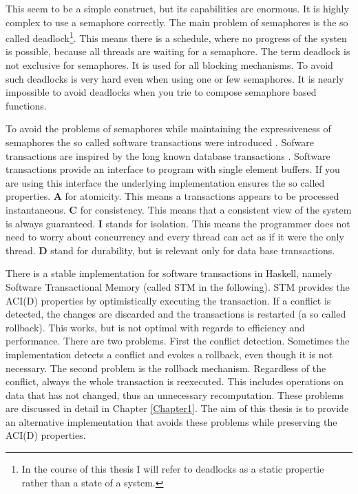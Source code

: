 This seem to be a simple construct, but its capabilities are enormous. It is highly complex to use a semaphore correctly.
The main problem of semaphores is the so called deadlock\footnote{In the course of this thesis I will refer to deadlocks as a static propertie rather than a state of a system.}. 
This means there is a schedule, where no progress of the systen is possible, because all threads are waiting for a semaphore. The term deadlock is not exclusive for semaphores.
It is used for all blocking mechanisms. To avoid such deadlocks is very hard even when using one or few semaphores. 
It is nearly impossible to avoid deadlocks when you trie to compose semaphore based functions.

To avoid the problems of semaphores while maintaining the expressiveness of semaphores the so called software transactions were introduced \parencite{STMBase}.
Sofware transactions are inspired by the long known database transactions \parencite{DBTrans}. Software transactions provide an interface to program with 
single element buffers. If you are using this interface the underlying implementation ensures the so called  properties. \textbf{A} for atomicity.
This means a transactions appears to be processed instantaneous. \textbf{C} for consistency. This means that a consistent view of the system is always guaranteed.
\textbf{I} stands for isolation. This means the programmer does not need to worry about concurrency and every thread can act as if it were the only thread. 
\textbf{D} stand for durability, but is relevant only for data base transactions. 

There is a stable implementation for software transactions in Haskell, namely Software Transactional Memory (called STM in the following). STM provides the ACI(D)
properties by optimistically executing the transaction. If a conflict is detected, the changes are discarded and the transactions is restarted (a so called rollback). 
This works, but is not optimal with regards to efficiency and performance. There are two problems. First the conflict detection. Sometimes the implementation detects 
a conflict and evokes a rollback, even though it is not necessary. The second problem is the rollback mechanism. Regardless of the conflict, always the whole transaction
is reexecuted. This includes operations on data that has not changed, thus an unnecessary recomputation. These problems are discussed in detail in Chapter \ref{Chapter1}. 
The aim of this thesis is to provide an alternative implementation that avoids these problems while preserving the ACI(D) properties.
